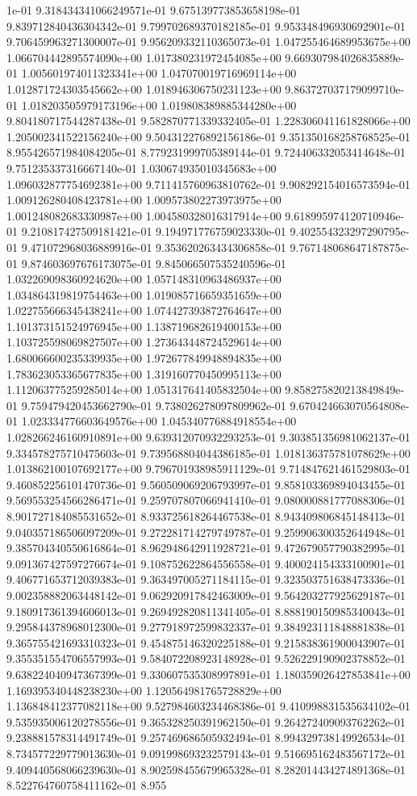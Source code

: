 1e-01	9.318434341066249571e-01	9.675139773853658198e-01	9.839712840436304342e-01	9.799702689370182185e-01	9.953348496930692901e-01	9.706459963271300007e-01	9.956209332110365073e-01	1.047255464689953675e+00	1.066704442895574090e+00	1.017380231972454085e+00	9.669307984026835889e-01	1.005601974011323341e+00	1.047070019716969114e+00	1.012871724303545662e+00	1.018946306750231123e+00	9.863727037179099710e-01	1.018203505979173196e+00	1.019808389885344280e+00	9.804180717544287438e-01	9.582870771339332405e-01	1.228306041161828066e+00	1.205002341522156240e+00	9.504312276892156186e-01	9.351350168258768525e-01	8.955426571984084205e-01	8.779231999705389144e-01	9.724406332053414648e-01	9.751235337316667140e-01	1.030674935010345683e+00	1.096032877754692381e+00	9.711415760963810762e-01	9.908292154016573594e-01	1.009126280408423781e+00	1.009573802273973975e+00	1.001248082683330987e+00	1.004580328016317914e+00	9.618995974120710946e-01	9.210817427509181421e-01	9.194971776759023330e-01	9.402554323297290795e-01	9.471072968036889916e-01	9.353620263434306858e-01	9.767148068647187875e-01	9.874603697676173075e-01	9.845066507535240596e-01	1.032269098360924620e+00	1.057148310963486937e+00	1.034864319819754463e+00	1.019085716659351659e+00	1.022755666345438241e+00	1.074427393872764647e+00	1.101373151524976945e+00	1.138719682619400153e+00	1.103725598069827507e+00	1.273643448724529614e+00	1.680066600235339935e+00	1.972677849948894835e+00	1.783623053365677835e+00	1.319160770450995113e+00	1.112063775259285014e+00	1.051317641405832504e+00	9.858275820213849849e-01	9.759479420453662790e-01	9.738026278097809962e-01	9.670424663070564808e-01	1.023334776603649576e+00	1.045340776884918554e+00	1.028266246160910891e+00	9.639312070932293253e-01	9.303851356981062137e-01	9.334578275710475603e-01	9.739568804044386185e-01	1.018136375781078629e+00	1.013862100107692177e+00	9.796701938985911129e-01	9.714847621461529803e-01	9.460852256101470736e-01	9.560509069206793997e-01	9.858103369894043455e-01	9.569553254566286471e-01	9.259707807066941410e-01	9.080000881777088306e-01	8.901727184085531652e-01	8.933725618264467538e-01	8.943409806845148413e-01	9.040357186506097209e-01	9.272281714279749787e-01	9.259906300352644948e-01	9.385704340550616864e-01	8.962948642911928721e-01	9.472679057790382995e-01	9.091367427597276674e-01	9.108752622864556558e-01	9.400024154333100901e-01	9.406771653712039383e-01	9.363497005271184115e-01	9.323503751638473336e-01	9.002358882063448142e-01	9.062920917842463009e-01	9.564203277925629187e-01	9.180917361394606013e-01	9.269492820811341405e-01	8.888190150985340043e-01	9.295844378968012300e-01	9.277918972599832337e-01	9.384923111848881838e-01	9.365755421693310323e-01	9.454875146320225188e-01	9.215838361900043907e-01	9.355351554706557993e-01	9.584072208923148928e-01	9.526229190902378852e-01	9.638224040947367399e-01	9.330607535308997891e-01	1.180359026427853841e+00	1.169395340448238230e+00	1.120564981765728829e+00	1.136848412377082118e+00	9.527984603234468386e-01	9.410998831535634102e-01	9.535935006120278556e-01	9.365328250391962150e-01	9.264272409093762262e-01	9.238881578314491749e-01	9.257469686505932494e-01	8.994329738149926534e-01	8.734577229779013630e-01	9.091998693232579143e-01	9.516695162483567172e-01	9.409440568066239630e-01	8.902598455679965328e-01	8.282014434274891368e-01	8.522764760758411162e-01	8.955